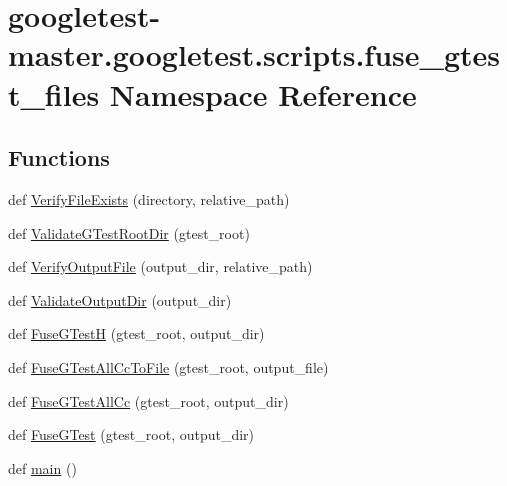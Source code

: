 \hypertarget{namespacegoogletest-master_1_1googletest_1_1scripts_1_1fuse__gtest__files}{}\section{googletest-\/master.googletest.\+scripts.\+fuse\+\_\+gtest\+\_\+files Namespace Reference}
\label{namespacegoogletest-master_1_1googletest_1_1scripts_1_1fuse__gtest__files}
\subsection*{Functions}
\begin{DoxyCompactItemize}
\item 
def \mbox{\hyperlink{namespacegoogletest-master_1_1googletest_1_1scripts_1_1fuse__gtest__files_a0a9d8acbd6fdde4621dcb6d0b340486b}{Verify\+File\+Exists}} (directory, relative\+\_\+path)
\item 
def \mbox{\hyperlink{namespacegoogletest-master_1_1googletest_1_1scripts_1_1fuse__gtest__files_a87c078da2aae6d0034023d9d6a31b5de}{Validate\+G\+Test\+Root\+Dir}} (gtest\+\_\+root)
\item 
def \mbox{\hyperlink{namespacegoogletest-master_1_1googletest_1_1scripts_1_1fuse__gtest__files_a35043ca8878d7330756b286eb81fe8a9}{Verify\+Output\+File}} (output\+\_\+dir, relative\+\_\+path)
\item 
def \mbox{\hyperlink{namespacegoogletest-master_1_1googletest_1_1scripts_1_1fuse__gtest__files_a9cb270487f77b24eae98e4d1eb4907c4}{Validate\+Output\+Dir}} (output\+\_\+dir)
\item 
def \mbox{\hyperlink{namespacegoogletest-master_1_1googletest_1_1scripts_1_1fuse__gtest__files_af242da18f3591868f23a75ef3fc0282c}{Fuse\+G\+TestH}} (gtest\+\_\+root, output\+\_\+dir)
\item 
def \mbox{\hyperlink{namespacegoogletest-master_1_1googletest_1_1scripts_1_1fuse__gtest__files_ab7129c36cbfcee2dedb66ded75e1029a}{Fuse\+G\+Test\+All\+Cc\+To\+File}} (gtest\+\_\+root, output\+\_\+file)
\item 
def \mbox{\hyperlink{namespacegoogletest-master_1_1googletest_1_1scripts_1_1fuse__gtest__files_ae7a4a904c470670bed357a5c41c6436b}{Fuse\+G\+Test\+All\+Cc}} (gtest\+\_\+root, output\+\_\+dir)
\item 
def \mbox{\hyperlink{namespacegoogletest-master_1_1googletest_1_1scripts_1_1fuse__gtest__files_afb5c44aaaf8f2eacd1d240368d9ef1f0}{Fuse\+G\+Test}} (gtest\+\_\+root, output\+\_\+dir)
\item 
def \mbox{\hyperlink{namespacegoogletest-master_1_1googletest_1_1scripts_1_1fuse__gtest__files_aede50cff168fdba596bdbc2988952a7e}{main}} ()
\end{DoxyCompactItemize}
